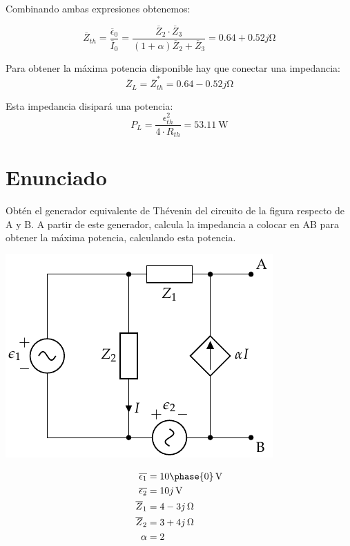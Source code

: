 Combinando ambas expresiones obtenemos:

\begin{equation*}
  \overline{Z}_{th} = \frac{\overline{\epsilon}_0}{\overline{I}_0} = \frac{\overline{Z}_2 \cdot \overline{Z}_3}{(1 + \alpha) \overline{Z}_2 + \overline{Z}_3} = 0.64 + 0.52j\si{\ohm}
\end{equation*}

Para obtener la máxima potencia disponible hay que conectar una impedancia:
\begin{equation*}
\overline{Z}_L = \overline{Z}^*_{th} = 0.64-0.52j\si{\ohm}
\end{equation*}

Esta impedancia disipará una potencia:
\begin{equation*}
P_L = \frac{\epsilon_{th}^2}{4 \cdot R_{th}} = \qty{53.11}{\watt}
\end{equation*}


\section{Enunciado}

Obtén el generador equivalente de Thévenin del circuito de la figura respecto de A y B. A partir de este generador, calcula la impedancia a colocar en AB para obtener la máxima potencia, calculando esta potencia.

\begin{minipage}{0.5\textwidth}
\begin{center}
\includegraphics{figuras/Thevenin5}
\end{center}
\end{minipage}
\begin{minipage}{0.5\textwidth}
  \begin{align*}
    \overline{\epsilon_1} &= \SI[parse-numbers=false]{10\phase{0}}{\volt}\\
    \overline{\epsilon_2} &= \SI[parse-numbers=false]{10j}{\volt}\\
    \overline{Z}_1 &= \SI[parse-numbers=false]{4 - 3j}{\ohm}\\
    \overline{Z}_2 &= \SI[parse-numbers=false]{3 + 4j}{\ohm}\\
    \alpha &= 2
  \end{align*}
\end{minipage}
